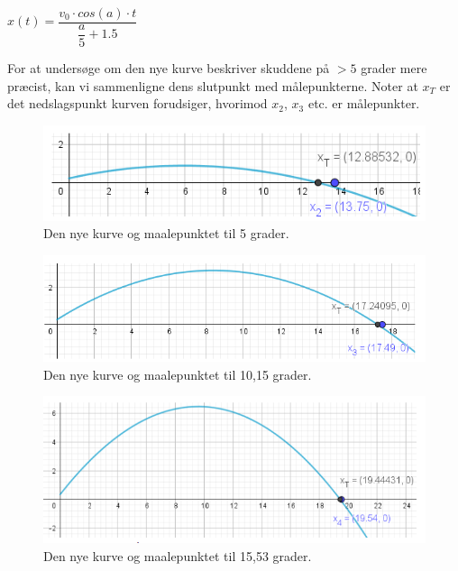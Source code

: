 \begin{center}
\begin{math}
x(t) = \dfrac{v_{0} \cdot cos(a) \cdot t}{\dfrac{a}{5} + 1.5}
\end{math}
\end{center}

For at undersøge om den nye kurve beskriver skuddene på $ > 5 $ grader mere præcist, kan vi sammenligne dens slutpunkt med målepunkterne. Noter at $ x_{T} $ er det nedslagspunkt kurven forudsiger, hvorimod $x_{2}$, $x_{3}$ etc. er målepunkter.\\

\begin{figure}[H]
\centering
\includegraphics[scale=0.7]{Billeder/Resultatbehandling6.png}
\caption{Den nye kurve og maalepunktet til 5 grader.}
\label{fig:Resultatbehandling6}
\end{figure}

\begin{figure}[H]
\centering
\includegraphics[scale=0.7]{Billeder/Resultatbehandling7.png}
\caption{Den nye kurve og maalepunktet til 10,15 grader.}
\label{fig:Resultatbehandling7}
\end{figure}

\begin{figure}[H]
\centering
\includegraphics[scale=0.7]{Billeder/Resultatbehandling8.png}
\caption{Den nye kurve og maalepunktet til 15,53 grader.}
\label{fig:Resultatbehandling8}
\end{figure}

